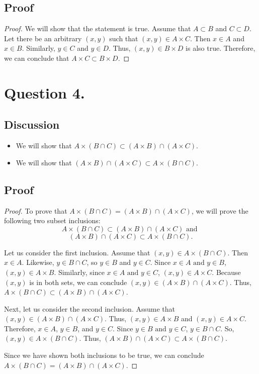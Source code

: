 \documentclass{article}
\begin{document}
\subsection*{Proof}
\begin{proof}
    We will show that the statement  is true. Assume that $ A \subset B $ and $ C \subset D $. Let there be an arbitrary $ (x, y) $ such that $ (x, y) \in A \times C $. Then $ x \in A $ and $ x \in B $. Similarly, $ y \in C $ and $ y \in D $.
    Thus, $ (x, y) \in B \times D $ is also true. Therefore, we can conclude that $ A \times C \subset B \times D $.
\end{proof}

\section*{Question 4.}
\subsection*{Discussion}
\begin{itemize}
    \item We will show that $ A \times (B \cap C) \subset (A \times B) \cap (A \times C) $.
    \item We will show that $ (A \times B) \cap (A \times C) \subset A \times (B \cap C) $.
\end{itemize}

\subsection*{Proof}
\begin{proof}
    To prove that $ A \times (B \cap C) = (A \times B) \cap (A \times C) $, we will prove the following two subset inclusions: 
    \[ A \times (B \cap C) \subset (A \times B) \cap (A \times C) \mbox{ and } \]
    \[ (A \times B) \cap (A \times C) \subset A \times (B \cap C). \]

    \noindent Let us consider the first inclusion. Assume that $ (x, y) \in A \times (B \cap C) $. Then $ x \in A $. Likewise, $ y \in B \cap C $, so $ y \in B $ and $ y \in C $. Since $ x \in A \mbox{ and } y \in B $, $ (x, y) \in A \times B $. Similarly, since $ x \in A \mbox{ and } y \in C $, $ (x, y) \in A \times C $. Because $ (x, y) $ is in both
    sets, we can conclude $ (x, y) \in (A \times B) \cap (A \times C) $. Thus, $ A \times (B \cap C) \subset (A \times B) \cap (A \times C) $.

    \noindent Next, let us consider the second inclusion. Assume that $ (x, y) \in (A \times B) \cap (A \times C) $. Thus, $ (x, y) \in A \times B $ and $ (x, y) \in A \times C $. Therefore, $ x \in A $, $ y \in B $, and $ y \in C $. Since $ y \in B \mbox{ and } y \in C $, $ y \in B \cap C $. So, $ (x, y) \in A \times (B \cap C) $. Thus, $ (A \times B) \cap (A \times C) \subset A \times (B \cap C) $.

    \noindent Since we have shown both inclusions to be true, we can conclude $ A \times (B \cap C) = (A \times B) \cap (A \times C) $.
\end{proof}
\end{document}
